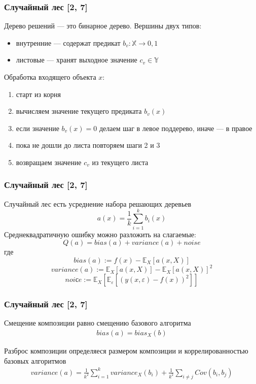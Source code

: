 \documentclass{beamer}
\newcommand{\COV}[2]{Cov\left(#1, #2\right)}
\renewcommand{\epsilon}{\varepsilon}
\begin{document}
\begin{frame}
    \frametitle{Случайный лес [2, 7]}

    Дерево решений --- это бинарное дерево.
    Вершины двух типов:
    \begin{itemize}
        \item внутренние --- содержат предикат $b_v: \mathbb{X} \rightarrow {0, 1}$
        \item листовые --- хранят выходное значение $c_v \in \mathbb{Y}$
    \end{itemize}

    Обработка входящего объекта $x$:
    \begin{enumerate}
        \item старт из корня
        \item вычисляем значение текущего предиката $b_v(x)$
        \item если значение $b_v(x) = 0$ делаем шаг в левое поддерево, иначе --- в правое
        \item пока не дошли до листа повторяем шаги 2 и 3
        \item возвращаем значение $c_v$ из текущего листа
    \end{enumerate}
\end{frame}

\begin{frame}
    \frametitle{Случайный лес [2, 7]}

    Случайный лес есть усреднение набора решающих деревьев
    \[
        a(x) = \frac{1}{k} \sum_{i=1}^{k} b_i(x)
    \]
    Среднеквадратичную ошибку можно разложить на слагаемые:
    \[
        Q(a) = bias(a) + variance(a) + noise
    \]
    где 
    \[
        bias(a) := f(x) - \mathbb{E}_X\left[a(x, X)\right]
    \]
    \[
        variance(a) := \mathbb{E}_X\left[a(x, X)\right] -\mathbb{E}_X\left[a(x, X)\right]^2
    \]
    \[
        noiсe := \mathbb{E}_X\left[\mathbb{E}_{\epsilon}\left[\left( y(x, \epsilon) - f(x) \right)^2\right]\right]
    \]
\end{frame}

\begin{frame}
    \frametitle{Случайный лес [2, 7]}

    Смещение композиции равно смещению базового алгоритма
    \begin{align*}
        bias(a) = bias_X(b)
    \end{align*}
    
    Разброс композиции определяеся размером композиции и коррелированностью базовых алгоритмов
    \begin{align*}
    	variance(a) =
         \frac{1}{k^2} \sum_{i=1}^{k} variance_X(b_i) + 
        \frac{1}{k^2} \sum_{i \ne j} \COV{b_i}{b_j}
    \end{align*}

\end{frame}
\end{document}

